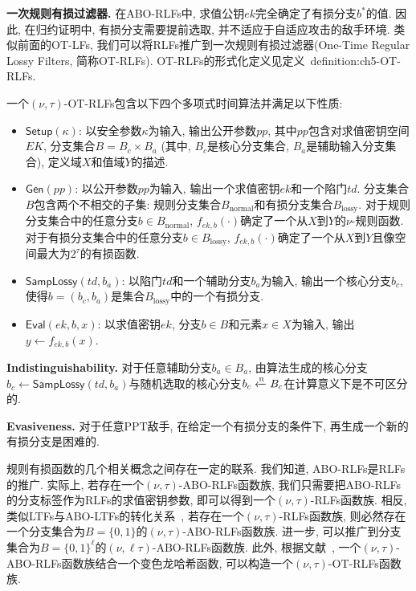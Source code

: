 \medskip\noindent\textbf{一次规则有损过滤器.} 在ABO-RLFs中, 求值公钥$ek$完全确定了有损分支$b^*$的值. 因此, 在归约证明中, 有损分支需要提前选取, 并不适应于自适应攻击的敌手环境. 类似前面的OT-LFs, 我们可以将RLFs推广到一次规则有损过滤器(One-Time Regular Lossy Filters, 简称OT-RLFs). OT-RLFs的形式化定义见定义~{definition:ch5-OT-RLFs}.
\begin{definition}[一次规则有损过滤器]\label{definition:ch5-OT-RLFs} 
一个$(\nu, \tau)$-OT-RLFs包含以下四个多项式时间算法并满足以下性质:
\begin{itemize}\itemsep 1pt \parskip 0pt \parsep 0pt
\item $\mathsf{Setup}(\kappa)$: 以安全参数$\kappa$为输入, 
输出公开参数$pp$, 其中$pp$包含对求值密钥空间$EK$, 
分支集合$B = B_c \times B_a$ (其中, $B_c$是核心分支集合, $B_a$是辅助输入分支集合), 定义域$X$和值域$Y$的描述. 

\item $\mathsf{Gen}(pp)$: 以公开参数$pp$为输入, 输出一个求值密钥$ek$和一个陷门$td$. 分支集合$B$包含两个不相交的子集: 规则分支集合$B_\text{normal}$和有损分支集合$B_\text{lossy}$. 
	对于规则分支集合中的任意分支$b \in B_\text{normal}$, $f_{ek, b}(\cdot)$确定了一个从$X$到$Y$的$\nu$-规则函数. 对于有损分支集合中的任意分支$b \in B_\text{lossy}$, $f_{ek, b}(\cdot)$确定了一个从$X$到$Y$且像空间最大为$2^{\tau}$的有损函数.

\item $\mathsf{SampLossy}(td, b_a)$: 以陷门$td$和一个辅助分支$b_a$为输入, 输出一个核心分支$b_c$, 使得$b = (b_c, b_a)$是集合$B_\text{lossy}$中的一个有损分支.

\item $\mathsf{Eval}(ek, b, x)$: 以求值密钥$ek$, 分支$b \in B$和元素$x \in X$为输入, 输出$y \leftarrow f_{ek, b}(x)$.
\end{itemize}

\begin{trivlist}
\item \textbf{Indistinguishability.} 对于任意辅助分支$b_a \in B_a$, 
	由算法生成的核心分支$b_c \leftarrow \mathsf{SampLossy}(td, b_a)$与随机选取的核心分支$b_c \xleftarrow{\textup{\tiny R}} B_c$在计算意义下是不可区分的.

\item \textbf{Evasiveness.} 对于任意PPT敌手, 在给定一个有损分支的条件下, 再生成一个新的有损分支是困难的.
\end{trivlist} 
\end{definition}

\begin{remark}
规则有损函数的几个相关概念之间存在一定的联系. 我们知道, ABO-RLFs是RLFs的推广. 实际上, 若存在一个$(\nu, \tau)$-ABO-RLFs函数族, 我们只需要把ABO-RLFs的分支标签作为RLFs的求值密钥参数, 即可以得到一个$(\nu, \tau)$-RLFs函数族. 相反, 类似LTFs与ABO-LTFs的转化关系~\cite{PW-STOC-2008}, 若存在一个$(\nu, \tau)$-RLFs函数族, 则必然存在一个分支集合为$B = \{0, 1\}$的$(\nu, \tau)$-ABO-RLFs函数族. 进一步, 可以推广到分支集合为$B = \{0, 1\}^\ell$的$(\nu, \ell\tau)$-ABO-RLFs函数族. 此外, 根据文献~\cite{Qin-PKC-2014}, 一个$(\nu, \tau)$-ABO-RLFs函数族结合一个变色龙哈希函数, 可以构造一个$(\nu, \tau)$-OT-RLFs函数族. 
\end{remark}

